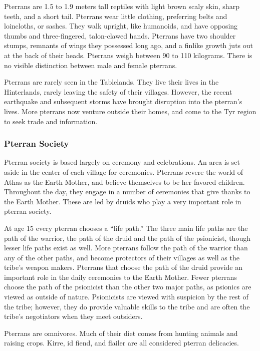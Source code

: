 Pterrans are 1.5 to 1.9 meters tall reptiles with light brown scaly skin, sharp teeth, and a short tail. Pterrans wear little clothing, preferring belts and loincloths, or sashes. They walk upright, like humanoids, and have opposing thumbs and three-fingered, talon-clawed hands. Pterrans have two shoulder stumps, remnants of wings they possessed long ago, and a finlike growth juts out at the back of their heads. Pterrans weigh between 90 to 110 kilograms. There is no visible distinction between male and female pterrans.

Pterrans are rarely seen in the Tablelands. They live their lives in the Hinterlands, rarely leaving the safety of their villages. However, the recent earthquake and subsequent storms have brought disruption into the pterran's lives. More pterrans now venture outside their homes, and come to the Tyr region to seek trade and information.

\subsubsection{Pterran Society}
Pterran society is based largely on ceremony and celebrations. An area is set aside in the center of each village for ceremonies. Pterrans revere the world of Athas as the Earth Mother, and believe themselves to be her favored children. Throughout the day, they engage in a number of ceremonies that give thanks to the Earth Mother. These are led by druids who play a very important role in pterran society.


At age 15 every pterran chooses a ``life path.'' The three main life paths are the path of the warrior, the path of the druid and the path of the psionicist, though lesser life paths exist as well. More pterrans follow the path of the warrior than any of the other paths, and become protectors of their villages as well as the tribe's weapon makers. Pterrans that choose the path of the druid provide an important role in the daily ceremonies to the Earth Mother. Fewer pterrans choose the path of the psionicist than the other two major paths, as psionics are viewed as outside of nature. Psionicists are viewed with suspicion by the rest of the tribe; however, they do provide valuable skills to the tribe and are often the tribe's negotiators when they meet outsiders.

Pterrans are omnivores. Much of their diet comes from hunting animals and raising crops. Kirre, id fiend, and flailer are all considered pterran delicacies.

